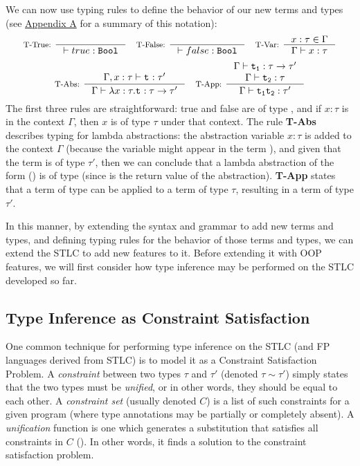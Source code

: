 We can now use typing rules to define the behavior of our new terms and types (see \hyperref[sec:AppA]{Appendix A} for a summary of this notation):
\begin{align*}
\inference[T-True: ]{}{\vdash true : \texttt{Bool}}
\quad
\inference[T-False: ]{}{\vdash false : \texttt{Bool}}
\quad
\inference[T-Var: ]{
  x:\tau \in \Gamma
}{\Gamma \vdash x:\tau}
\end{align*}
\begin{align*}
\inference[T-Abs: ]{
  \Gamma, x:\tau \vdash \tm{t}{}:\tau '
}{\Gamma \vdash \lambda x:\tau.\tm{t}{} : \tau \rightarrow \tau '}
\quad
\inference[T-App: ]{
  \Gamma \vdash \tm{t}{1} : \tau \rightarrow \tau ' \\
  \Gamma \vdash \tm{t}{2} : \tau
}{\Gamma \vdash \tm{t}{1} \tm{t}{2} : \tau '}
\end{align*}
The first three rules are straightforward: true and false are of type \Boolt{}, and if $x:\tau$ is in the context $\Gamma$, then $x$ is of type $\tau$ under that context. The rule \textbf{T-Abs} describes typing for lambda abstractions: the abstraction variable $x:\tau$ is added to the context $\Gamma$ (because the variable might appear in the term ), and given that the term  is of type $\tau '$, then we can conclude that a lambda abstraction of the form () is of type  (since  is the return value of the abstraction). \textbf{T-App} states that a term of type  can be applied to a term of type $\tau$, resulting in a term of type $\tau '$.

In this manner, by extending the syntax and grammar to add new terms and types, and defining typing rules for the behavior of those terms and types, we can extend the STLC to add new features to it. Before extending it with OOP features, we will first consider how type inference may be performed on the STLC developed so far.

\subsection{Type Inference as Constraint Satisfaction}

One common technique for performing type inference on the STLC (and FP languages derived from STLC) is to model it as a Constraint Satisfaction Problem. A \textit{constraint} between two types $\tau$ and $\tau '$ (denoted $\tau \sim \tau '$) simply states that the two types must be \textit{unified}, or in other words, they should be equal to each other. A \textit{constraint set} (usually denoted $C$) is a list of such constraints for a given program (where type annotations may be partially or completely absent). A \textit{unification} function is one which generates a substitution that satisfies all constraints in $C$ (\cite{splinter3}). In other words, it finds a solution to the constraint satisfaction problem.


